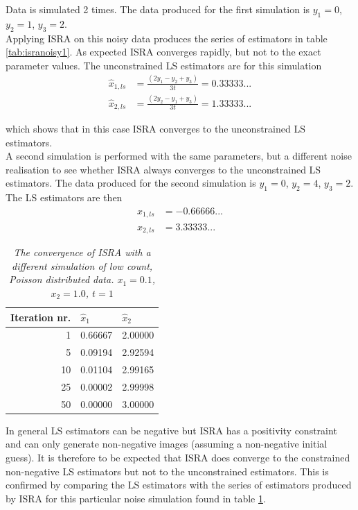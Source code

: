 \documentclass[report,12pt]{report}
\begin{document}
Data is simulated 2 times. The data produced for the first simulation is $y_1=0$, $y_2=1$, $y_3=2$.\\ 

Applying ISRA on this noisy data produces the series of estimators in table \ref{tab:isranoisy1}. As expected ISRA converges rapidly, but not to the exact parameter values. The unconstrained LS estimators are for this simulation
    \begin{align}
    	\hat x_{1,ls} & = \frac{(2 y_1 - y_2 + y_3)}{3t} = 0.33333...\nonumber\\
    	\hat x_{2,ls} & = \frac{(2 y_2 - y_1 + y_3)}{3t} = 1.33333...\nonumber
    \end{align}

which shows that in this case ISRA converges to the unconstrained LS estimators.\\

A second simulation is performed with the same parameters, but a different noise realisation to see whether ISRA always converges to the unconstrained LS estimators. The data produced for the second simulation is $y_1=0$, $y_2=4$, $y_3=2$. The LS estimators are then
\begin{align}
	\hat x_{1,ls} &= -0.66666...\nonumber\\
	\hat x_{2,ls} &= 3.33333...\nonumber
\end{align}

\setlength\intextsep{0pt}
\begin{table}
    	\begin{tabular}{|r| l| l|}
		\hline
    	{Iteration nr.}	&${\hat x_1}$	&${\hat x_2}$\\
    	\hline
1 & 0.66667 & 2.00000\\ 
5 & 0.09194 & 2.92594\\ 
10 & 0.01104 & 2.99165\\ 
25 & 0.00002 & 2.99998\\ 
50 & 0.00000 & 3.00000\\ 
    	\hline
	\end{tabular}
	\caption{\emph{The convergence of ISRA with a different simulation of low count, Poisson distributed data. $x_1 = 0.1$, $x_2 = 1.0$, $t = 1$}}
    \label{tab:isranoisy2}
\end{table}
In general LS estimators can be negative but ISRA has a positivity constraint and can only generate non-negative images (assuming a non-negative initial guess). It is therefore to be expected that ISRA does converge to the constrained non-negative LS estimators but not to the unconstrained estimators. This is confirmed by comparing the LS estimators with the series of estimators produced by ISRA for this particular noise simulation found in table \ref{tab:isranoisy2}.\\
\end{document}
